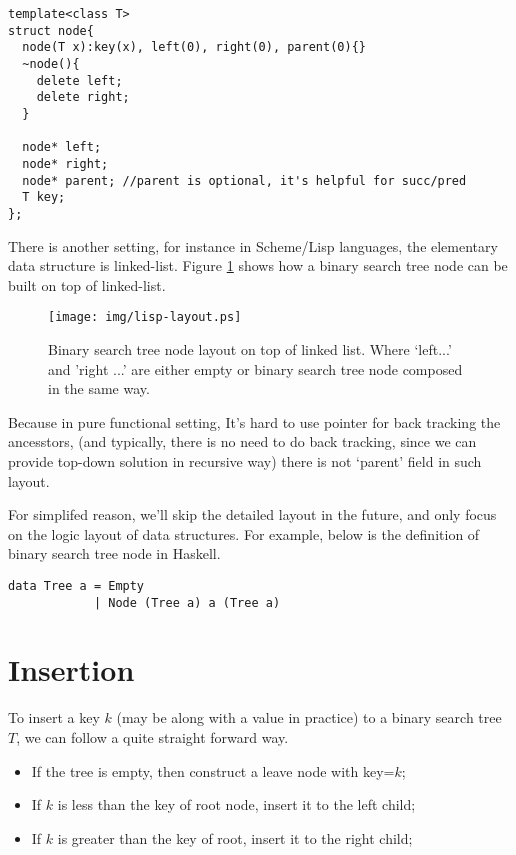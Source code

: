 \documentclass{article}
\begin{document}
\lstset{language=C++}
\begin{lstlisting}
template<class T>
struct node{
  node(T x):key(x), left(0), right(0), parent(0){}
  ~node(){ 
    delete left;
    delete right;
  }

  node* left; 
  node* right;
  node* parent; //parent is optional, it's helpful for succ/pred
  T key;
};
\end{lstlisting}

There is another setting, for instance in Scheme/Lisp languages, the elementary
data structure is linked-list. Figure \ref{fig:lisp-layout} shows how a binary
search tree node can be built on top of linked-list.

\begin{figure}[htbp]
       \begin{center}
        \texttt{[image: img/lisp-layout.ps]}
        \caption{Binary search tree node layout on top of linked list. Where `left...' and 'right ...' are either empty or binary search tree node composed in the same way.} \label{fig:lisp-layout}
       \end{center}
\end{figure}

Because in pure functional setting, It's hard to use pointer for back tracking
the ancesstors, (and typically, there is no need to do back tracking, since
we can provide top-down solution in recursive way) there is not `parent' field
in such layout.

For simplifed reason, we'll skip the detailed layout in the future, and only 
focus on the logic layout of data structures. For example, below is the definition
of binary search tree node in Haskell.

\lstset{language=Haskell}
\begin{lstlisting}
data Tree a = Empty 
            | Node (Tree a) a (Tree a)
\end{lstlisting}

\section{Insertion}

To insert a key $k$ (may be along with a value in practice) to a binary search tree $T$, we can follow a quite straight forward way.

\begin{itemize}
\item If the tree is empty, then construct a leave node with key=$k$;
\item If $k$ is less than the key of root node, insert it to the left child;
\item If $k$ is greater than the key of root, insert it to the right child;
\end{itemize}
\end{document}
